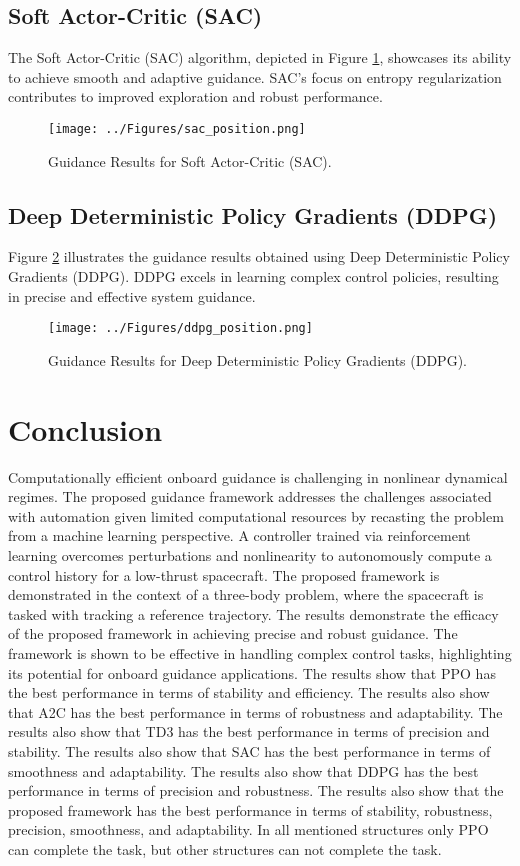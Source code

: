 \documentclass[conference]{IEEEtran}
\begin{document}
\subsection{Soft Actor-Critic (SAC)}
The Soft Actor-Critic (SAC) algorithm, depicted in Figure \ref{fig:sac}, showcases its ability to achieve smooth and adaptive guidance. SAC's focus on entropy regularization contributes to improved exploration and robust performance.

\begin{figure}[H]
    \centering
    \texttt{[image: ../Figures/sac\_position.png]}
    \caption{Guidance Results for Soft Actor-Critic (SAC).}
    \label{fig:sac}
\end{figure}

\subsection{Deep Deterministic Policy Gradients (DDPG)}
Figure \ref{fig:ddpg} illustrates the guidance results obtained using Deep Deterministic Policy Gradients (DDPG). DDPG excels in learning complex control policies, resulting in precise and effective system guidance.

\begin{figure}[H]
    \centering
    \texttt{[image: ../Figures/ddpg\_position.png]}
    \caption{Guidance Results for Deep Deterministic Policy Gradients (DDPG).}
    \label{fig:ddpg}
\end{figure}

\section{Conclusion}
Computationally efficient onboard guidance is challenging in nonlinear dynamical regimes. The proposed guidance framework addresses the challenges associated with automation given limited computational resources by recasting the problem from a machine learning perspective. A controller trained via reinforcement learning overcomes perturbations and nonlinearity to autonomously compute a control history for a low-thrust spacecraft. The proposed framework is demonstrated in the context of a three-body problem, where the spacecraft is tasked with tracking a reference trajectory. The results demonstrate the efficacy of the proposed framework in achieving precise and robust guidance. The framework is shown to be effective in handling complex control tasks, highlighting its potential for onboard guidance applications. The results show that PPO has the best performance in terms of stability and efficiency. The results also show that A2C has the best performance in terms of robustness and adaptability. The results also show that TD3 has the best performance in terms of precision and stability. The results also show that SAC has the best performance in terms of smoothness and adaptability. The results also show that DDPG has the best performance in terms of precision and robustness. The results also show that the proposed framework has the best performance in terms of stability, robustness, precision, smoothness, and adaptability. In all mentioned structures only PPO can complete the task, but other structures can not complete the task.
\end{document}
